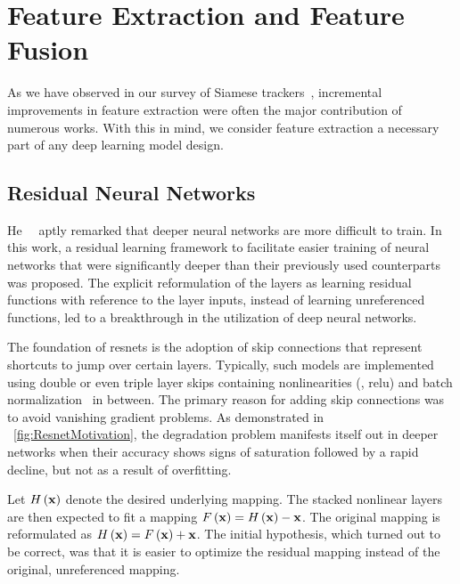 \section{Feature Extraction and Feature Fusion}
\label{sec:FeatureExtractionFusion}

As we have observed in our survey of Siamese trackers~\cite{ondrasovic2021siamese}, incremental improvements in feature extraction were often the major contribution of numerous works. With this in mind, we consider feature extraction a necessary part of any deep learning model design.

\subsection{Residual Neural Networks}
\label{ssec:ResidualNeuralNetworks}

He~\etal{}~\cite{he2015resnet} aptly remarked that deeper neural networks are more difficult to train. In this work, a residual learning framework to facilitate easier training of neural networks that were significantly deeper than their previously used counterparts was proposed. The explicit reformulation of the layers as learning residual functions with reference to the layer inputs, instead of learning unreferenced functions, led to a breakthrough in the utilization of deep neural networks.

The foundation of \glspl{resnet} is the adoption of skip connections that represent shortcuts to jump over certain layers. Typically, such models are implemented using double or even triple layer skips containing nonlinearities (\egtext{}, \gls{relu}) and batch normalization~\cite{ioffe2015batchnorm} in between. The primary reason for adding skip connections was to avoid vanishing gradient problems. As demonstrated in \figtext{}~\ref{fig:ResnetMotivation}, the degradation problem manifests itself out in deeper networks when their accuracy shows signs of saturation followed by a rapid decline, but not as a result of overfitting.

Let ${H} \left( \mathbf{x} \right)$ denote the desired underlying mapping. The stacked nonlinear layers are then expected to fit a mapping ${F} \left( \mathbf{x} \right) = {H} \left( \mathbf{x} \right) - \mathbf{x}$. The original mapping is reformulated as ${H} \left( \mathbf{x} \right) = {F} \left( \mathbf{x} \right) + \mathbf{x}$. The initial hypothesis, which turned out to be correct, was that it is easier to optimize the residual mapping instead of the original, unreferenced mapping.

